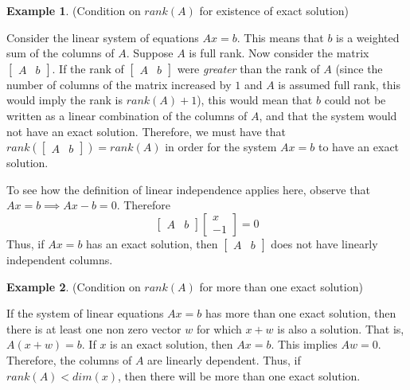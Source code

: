 \documentclass[12pt]{article}
\theoremstyle{definition}
\newtheorem{example}{Example}
\begin{document}
\begin{example}(Condition on $rank(A)$ for existence of exact solution)

Consider the linear system of equations $Ax = b$. This means that $b$ is a weighted sum of the columns of $A$. Suppose $A$ is full rank. Now consider the matrix $\begin{bmatrix} A & b\end{bmatrix}$. If the rank of $\begin{bmatrix} A & b\end{bmatrix}$ were \textit{greater} than the rank of $A$ (since the number of columns of the matrix increased by $1$ and $A$ is assumed full rank, this would imply the rank is $rank(A) + 1$), this would mean that $b$ could not be written as a linear combination of the columns of $A$, and that the system would not have an exact solution. Therefore, we must have that $rank (\begin{bmatrix} A & b\end{bmatrix}) = rank(A)$ in order for the system $Ax = b$ to have an exact solution. 

To see how the definition of linear independence applies here, observe that $Ax = b \implies Ax - b = 0$. Therefore
\begin{equation}
	\begin{bmatrix}
	A & b
	\end{bmatrix}
	\begin{bmatrix}
	x \\
	-1
	\end{bmatrix}
	=
	0
\end{equation}
Thus, if $Ax = b$ has an exact solution, then $\begin{bmatrix} A & b\end{bmatrix}$ does not have linearly independent columns. 
\end{example}

\begin{example}(Condition on $rank(A)$ for more than one exact solution)

If the system of linear equations $Ax = b$ has more than one exact solution, then there is at least one non zero vector $w$ for which $x+w$ is also a solution. That is, $A(x + w) = b$. If $x$ is an exact solution, then $Ax = b$. This implies $Aw = 0$. Therefore, the columns of $A$ are linearly dependent. Thus, if $rank(A) < dim(x)$, then there will be more than one exact solution. 
\end{example}
\end{document}
